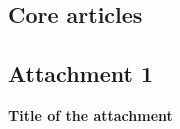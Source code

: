 \begin{appendices}
	\appendix
\chapter{Core articles}
\newpage

\section{Attachment 1}
\begin{center}
	\Large
	\vfill
	\textbf{Title of the attachment}
	\vfill
\end{center}



\end{appendices}